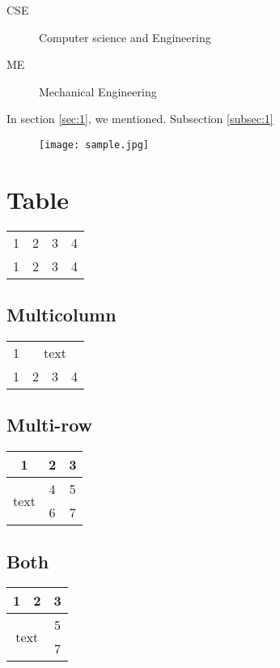 \documentclass[14pt]{article}
\begin{document}
\begin{description}
	\item[CSE] Computer science and Engineering
	\item[ME] Mechanical Engineering
\end{description}


In section \ref{sec:1}, we mentioned. Subsection \ref{subsec:1}

\begin{figure}[h]
	\centering
	\texttt{[image: sample.jpg]}
\end{figure}


\section{Table}

\begin{tabular}{|c|ccc|}
	\hline
	1 & 2 & 3 & 4 \\ 
	\cline{1-3}
	1 & 2 & 3 & 4  \\
	\hline
	
\end{tabular}


\subsection{Multicolumn}

\begin{tabular}{|c|ccc|}
	\hline
	1 & \multicolumn{3}{c|}{text} \\ 
	\cline{2-4}
	1 & 2 & 3 & 4  \\
	\hline
	
\end{tabular}


\subsection{Multi-row}

\begin{tabular}{|c|c|c|}
	\hline
	1 & 2 & 3 \\ 
	\hline
	\multirow{2}{*}{text} & 4 & 5 \\
	& 6 & 7 \\ 
	\hline
	
	
\end{tabular}

\subsection{Both}

\begin{tabular}{|cc|c|}
	\hline
	1 & 2 & 3 \\ 
	\hline
	\multicolumn{2}{|c|}{\multirow{2}{*}{text}} & 5 \\
	& & 7 \\
	\hline
	
	
\end{tabular}
\end{document}
